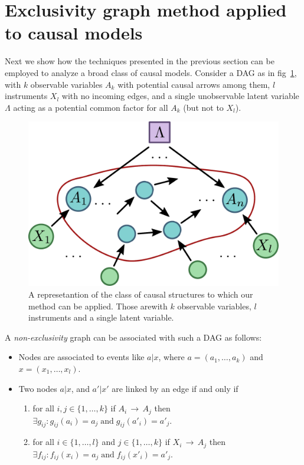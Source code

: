 \documentclass[letterpaper]{article}
\newcommand{\et}{\;\mathrm{and}\;}
\begin{document}
\section{Exclusivity graph method applied to causal models}
Next we show how the techniques presented in the previous section can be employed to analyze
a broad class of causal models. Consider a DAG as in fig~\ref{fig:onelambda}, with
$k$ observable variables $A_k$ with potential causal arrows among them, $l$
instruments $X_l$ with no incoming edges, and a single unobservable latent
variable $\Lambda$ acting as a potential common factor for all $A_k$ (but not to
$X_l$).

\begin{figure}[h]
    \centering
    \includegraphics[width=.9\columnwidth]{images/onelambda.pdf}
    \caption{A represetantion of the class of causal structures to which our
    method can be applied.
    Those arewith $k$ observable variables, $l$ instruments and a single latent     variable.}
    \label{fig:onelambda}
\end{figure}

A \emph{non-exclusivity} graph can be associated with such a DAG
as follows:
\begin{itemize}
    \item Nodes are associated to events like $a | x$, where $a = (a_1,\ldots,a_k)$ and  $x = (x_1,\ldots,x_l)$.
    \item Two nodes $a | x $, and $a' | x'$ are linked by an edge if and only if 
        \begin{enumerate}
            \item for all $i,j \in \{1,\ldots,k\}$ if $A_i\,
                \rightarrow\, A_j$ then $\exists g_{ij} : g_{ij}(a_i) = a_j
                \et g_{ij}(a'_i) = a'_j$.
            \item for all $i\in \{1,\ldots,l\}$ and $j\in \{1,\ldots,k\}$ if
                $X_i\,\rightarrow\,A_j$ then $\exists f_{ij} : f_{ij}(x_i) = a_j
                \et f_{ij}(x'_i) = a'_j$.
        \end{enumerate}
\end{itemize}
\end{document}
